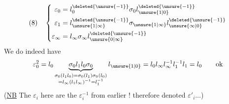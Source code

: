 \[
(8)\quad\left\{\begin{aligned}
\varepsilon_0&=l_0^{\deleted{\unsure{-1}}}\sigma_0l_{\unsure{1|0}}^{\deleted{\unsure{-1}}}\\
\varepsilon_1&=l_{\unsure{1|\infty}}^{\deleted{\unsure{-1}}}\sigma_{\unsure{1|\infty}}l_{\unsure{\infty|0}}^{\deleted{\unsure{-1}}}\\
\varepsilon_\infty&=l_\infty\sigma_\infty l_{\unsure{0|\infty}}^{\deleted{\unsure{-1}}}
\end{aligned}\right.
\]
We do indeed have
\[
\varepsilon_0^2=l_0\underbrace{\sigma_0l_1l_0\sigma_0}_{\substack{\sigma_0(l_1l_0)=\sigma_0(l_1)\sigma_0(l_0)\\=l_\infty(l_1l_\infty)^{-1}=l_1^{-1}}}l_{\unsure{1|0}}=l_0l_\infty l_\infty^{-1}l_1^{-1}l_1=l_0\qquad\text{ok}
\]
(\uline{NB} The $\varepsilon_i$ here are the $\varepsilon_i^{-1}$ from earlier !    therefore denoted $\varepsilon'_i\ldots$)


